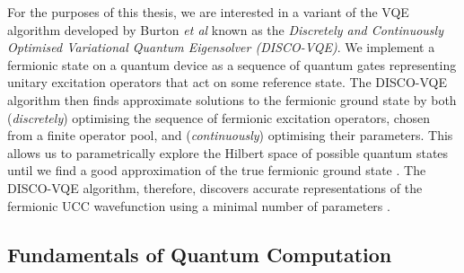 For the purposes of this thesis, we are interested in a variant of the VQE algorithm developed by Burton \textit{et al} \cite{Burton2023} known as the \textit{Discretely and Continuously Optimised Variational Quantum Eigensolver (DISCO-VQE)}. We implement a fermionic state on a quantum device as a sequence of quantum gates representing unitary excitation operators that act on some reference state. The DISCO-VQE algorithm then finds approximate solutions to the fermionic ground state by both (\textit{discretely}) optimising the sequence of fermionic excitation operators, chosen from a finite operator pool, and (\textit{continuously}) optimising their parameters. This allows us to parametrically explore the Hilbert space of possible quantum states until we find a good approximation of the true fermionic ground state \cite{Taube2006}. The DISCO-VQE algorithm, therefore, discovers accurate representations of the fermionic UCC wavefunction using a minimal number of parameters \cite{Burton2023}.

\subsection{Fundamentals of Quantum Computation}%
\label{fundamentals-quantum-computing}

